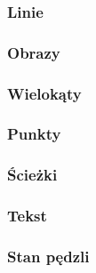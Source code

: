 \subsubsection{Linie}


\subsubsection{Obrazy}


\subsubsection{Wielokąty}


\subsubsection{Punkty}


\subsubsection{Ścieżki}


\subsubsection{Tekst}


\subsubsection{Stan pędzli}
